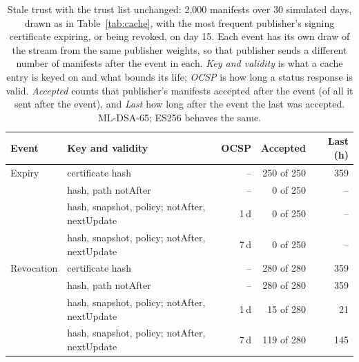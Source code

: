 \begin{table}[ht]
\caption{Stale trust with the trust list unchanged: 2,000 manifests over 30 simulated days, drawn as in Table~\ref{tab:cache}, with the most frequent publisher's signing certificate expiring, or being revoked, on day 15. Each event has its own draw of the stream from the same publisher weights, so that publisher sends a different number of manifests after the event in each. \emph{Key and validity} is what a cache entry is keyed on and what bounds its life; \emph{OCSP} is how long a status response is valid. \emph{Accepted} counts that publisher's manifests accepted after the event (of all it sent after the event), and \emph{Last} how long after the event the last was accepted. ML-DSA-65; ES256 behaves the same.}
\label{tab:cachestale}
\small
\setlength{\tabcolsep}{4pt}
\begin{tabular}{llrrr}
\toprule
Event & Key and validity & OCSP & Accepted & Last (h)\\
\midrule
Expiry & certificate hash & -- & 250 of 250 & 359\\
 & hash, path notAfter & -- & 0 of 250 & --\\
 & hash, snapshot, policy; notAfter, nextUpdate & 1\,d & 0 of 250 & --\\
 & hash, snapshot, policy; notAfter, nextUpdate & 7\,d & 0 of 250 & --\\
\midrule
Revocation & certificate hash & -- & 280 of 280 & 359\\
 & hash, path notAfter & -- & 280 of 280 & 359\\
 & hash, snapshot, policy; notAfter, nextUpdate & 1\,d & 15 of 280 & 21\\
 & hash, snapshot, policy; notAfter, nextUpdate & 7\,d & 119 of 280 & 145\\
\bottomrule
\end{tabular}
\end{table}
